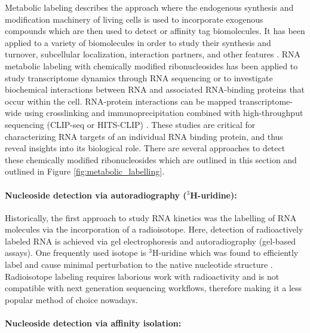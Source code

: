 Metabolic labeling describes the approach where the endogenous synthesis and modification machinery of living cells is used to incorporate exogenous compounds which are then used to detect or affinity tag biomolecules. It has been applied to a variety of biomolecules in order to study their synthesis and turnover, subcellular localization, interaction partners, and other features \citep{Kleiner2021}. RNA metabolic labeling with chemically modified ribonucleosides has been applied to study transcriptome dynamics through RNA sequencing or to investigate biochemical interactions between RNA and associated RNA-binding proteins that occur within the cell. RNA-protein interactions can be mapped transcriptome-wide using crosslinking and immunoprecipitation combined with high-throughput sequencing (CLIP-seq or HITS-CLIP) \citep{Nechay2020}. These studies are critical for characterizing  RNA targets of an individual RNA binding protein, and thus reveal insights into its biological role. There are several approaches to detect these chemically modified ribonucleosides which are outlined in this section and outlined in Figure \ref{fig:metabolic_labelling}.

\paragraph{Nucleoside detection via autoradiography ($^3$H-uridine):}

Historically, the first approach to study RNA kinetics was the labelling of RNA molecules via the incorporation of a radioisotope. Here, detection of radioactively labeled RNA is achieved via gel electrophoresis and  autoradiography (gel-based assays).  One frequently used isotope is $^3$H-uridine  which was found to efficiently label and cause minimal perturbation to the native nucleotide structure \citep{Rovera1970}. Radioisotope labeling requires laborious work with radioactivity and is not compatible with next generation sequencing workflows, therefore making it a less popular method of choice nowadays.

\paragraph{Nucleoside detection via affinity isolation:}

